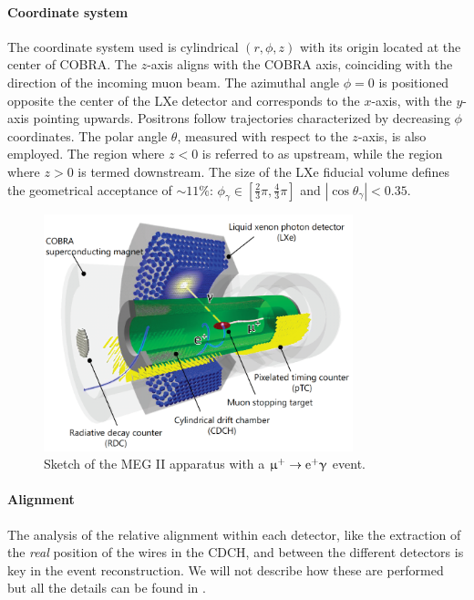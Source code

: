 \begin{refsection}
    \paragraph{Coordinate system}
    The coordinate system used is cylindrical $(r, \phi, z)$ with its origin located at the center of COBRA. 
    The $z$-axis aligns with the COBRA axis, coinciding with the direction of the incoming muon beam. 
    The azimuthal angle $\phi = 0$ is positioned opposite the center of the LXe detector and corresponds to the $x$-axis, with the $y$-axis pointing upwards. 
    Positrons follow trajectories characterized by decreasing $\phi$ coordinates. The polar angle $\theta$, measured with respect to the $z$-axis, is also employed. 
    The region where $z < 0$ is referred to as upstream, while the region where $z > 0$ is termed downstream.
    The size of the LXe fiducial volume defines the geometrical acceptance of $\sim 11\%$: $\phi_\gamma \in [\frac{2}{3}\pi, \frac{4}{3}\pi]$ and $|\cos\theta_\gamma| < 0.35$. 

    \begin{figure}
        \centering
        \includegraphics[width = 0.8\textwidth]{Figures/Introduction/MEG_II.png}
        \caption{Sketch of the MEG II apparatus with a $\upmu^+\rightarrow\text{e}^+\upgamma$ event.}
        \label{fig:MEGII}
    \end{figure}

    \paragraph{Alignment} The analysis of the relative alignment within each detector, like the extraction of the \textit{real} position of the wires in the CDCH, and between the different detectors is key in the event reconstruction.
    We will not describe how these are performed but all the details can be found in \cite{MEG_II:detector}.


\end{refsection}
